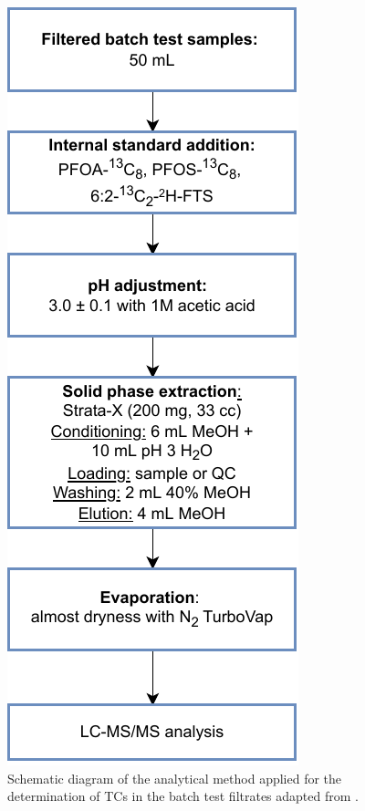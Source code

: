 \begin{figure}
    \centering
    \includegraphics{Diagrams/Methods-Analytical_method.pdf}
    \caption{Schematic diagram of the analytical method applied for the determination of TCs in the batch test filtrates adapted from \cite{arvaniti2012diagram}.}
    \label{fig:analyticalMethod}
\end{figure}

